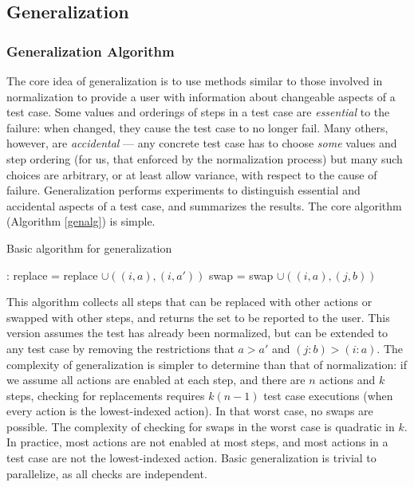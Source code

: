 \subsection{Generalization}

\subsubsection{Generalization Algorithm}

The core idea of generalization is to use methods similar to those
involved in normalization to provide a user with information about
changeable aspects of a test case.  Some values and orderings of steps
in a test case are \emph{essential} to the failure: when changed, they
cause the test case to no longer fail.  Many others, however, are
\emph{accidental} --- any concrete test case has to choose \emph{some}
values and step ordering (for us, that enforced by the normalization
process) but many such choices are arbitrary, or at least allow
variance, with respect to the cause of failure.  Generalization
performs experiments to distinguish essential and accidental aspects
of a test case, and summarizes the results.  The core algorithm
(Algorithm \ref{genalg}) is simple.

\begin{algorithm}
\caption{Basic algorithm for generalization}
\label{genalg}
\begin{algorithmic}[1]
:
\State replace = replace $\cup ((i,a),(i,a'))$
\EndIf
\EndFor 
{}
\State swap = swap $\cup ((i,a),(j,b))$
\EndIf
\EndFor
\EndFor
{}
\end{algorithmic}
\end{algorithm}

This algorithm collects all steps that can be replaced with other
actions or swapped with other steps, and returns the set to be
reported to the user.  This version assumes the test has already been
normalized, but can be extended to any test case by removing the
restrictions that $a > a'$ and $(j : b) > (i : a)$.  The complexity of
generalization is simpler to determine than that of normalization: if
we assume all actions are enabled at each step, and there are $n$
actions and $k$ steps, checking for replacements requires $k (n-1)$
test case executions (when every action is the lowest-indexed action).
In that worst case, no swaps are possible.  The complexity of checking
for swaps in the worst case is quadratic in $k$.  In practice, most
actions are not enabled at most steps, and most actions in a test case
are not the lowest-indexed action.  Basic generalization is trivial to
parallelize, as all checks are independent.


